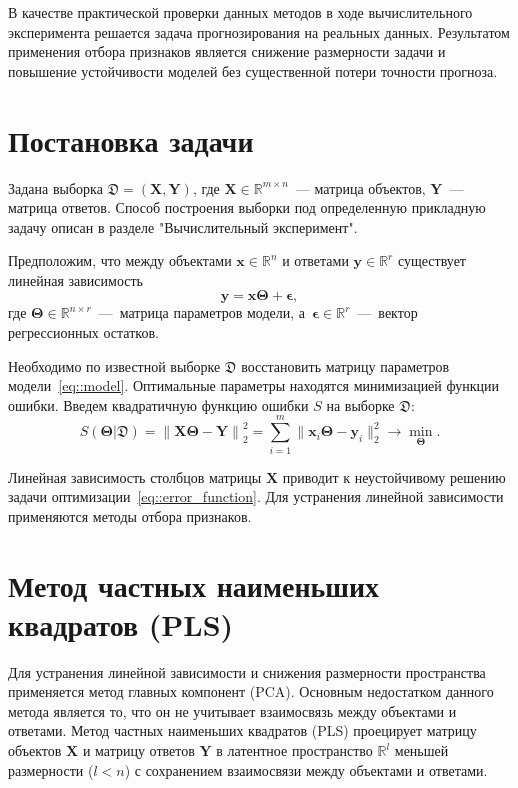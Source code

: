 \documentclass[12pt,twoside]{article}
\newcommand{\bx}{\mathbf{x}}
\newcommand{\by}{\mathbf{y}}
\newcommand{\bY}{\mathbf{Y}}
\newcommand{\bX}{\mathbf{X}}
\newcommand{\bTheta}{\boldsymbol{\Theta}}
\begin{document}
В качестве практической проверки данных методов в ходе вычислительного эксперимента решается задача прогнозирования на реальных данных.
Результатом применения отбора признаков является снижение размерности задачи и повышение устойчивости моделей без существенной потери точности прогноза.
 

\section{Постановка задачи}
Задана выборка $\mathfrak{D}= \left( \bX, \bY \right)$, где $\mathbf{X} \in \mathbb{R}^{m \times n}$~--- матрица объектов, $\mathbf{Y} $~--- матрица ответов. 
Способ построения выборки под определенную прикладную задачу описан в разделе "Вычислительный эксперимент".

Предположим, что между объектами $\bx \in \mathbb{R}^n$ и ответами $\by \in \mathbb{R}^r$ существует линейная зависимость 
\begin{equation}
\by = \bx \bTheta + \boldsymbol{\epsilon}, 
\label{eq::model}
\end{equation}
где $\bTheta \in \mathbb{R}^{n \times r}$~---~матрица параметров модели, а~$\boldsymbol{\epsilon}\in \mathbb{R}^{r}$~---~вектор регрессионных остатков.

Необходимо по известной выборке $\mathfrak{D}$ восстановить матрицу параметров модели~\eqref{eq::model}.
Оптимальные параметры находятся минимизацией функции ошибки.
Введем квадратичную функцию ошибки $S$ на выборке $\mathfrak{D}$:
\begin{equation}
	S(\bTheta | \mathfrak{D}) = {\bigl\| \mathbf{X}\bTheta - \mathbf{Y} \bigr\| }_2^2 = \sum_{i=1}^m \| \bx_i \bTheta - \by_i\|_2^2 \rightarrow\min_{\bTheta}.
\label{eq::error_function}
\end{equation}
 
Линейная зависимость столбцов матрицы $\bX$ приводит к неустойчивому решению задачи оптимизации~\eqref{eq::error_function}. Для устранения линейной зависимости применяются методы отбора признаков.

\section{Метод частных наименьших квадратов (PLS)}

Для устранения линейной зависимости и снижения размерности пространства применяется метод главных компонент (PCA). 
Основным недостатком данного метода является то, что он не учитывает взаимосвязь между объектами и ответами.
Метод частных наименьших квадратов (PLS) проецирует матрицу объектов $\bX$ и матрицу ответов $\bY$ в латентное пространство $\mathbb{R}^l$ меньшей размерности ($l < n$) с сохранением взаимосвязи между объектами и ответами.
\end{document}
